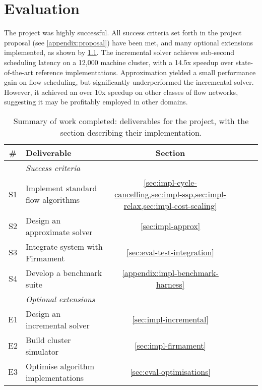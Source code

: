 \chapter{Evaluation} \label{chap:eval}

The project was highly successful. All success criteria set forth in the project proposal (see \cref{appendix:proposal}) have been met, and many optional extensions implemented, as shown by \cref{table:eval-project-requirements}. The incremental solver achieves sub-second scheduling latency on a 12,000 machine cluster, with a 14.5x speedup over state-of-the-art reference implementations. Approximation yielded a small performance gain on flow scheduling, but significantly underperformed the incremental solver. However, it achieved an over 10x speedup on other classes of flow networks, suggesting it may be profitably employed in other domains.

\begin{table}
    \centering
    \begin{tabular}{clcccc}
        \textbf{\#} & \textbf{Deliverable} & \textbf{Section}
        \tabularnewline
        \hline
        & \textit{Success criteria} \tabularnewline
        S1 & Implement standard flow algorithms & \cref{sec:impl-cycle-cancelling,sec:impl-ssp,sec:impl-relax,sec:impl-cost-scaling} \tabularnewline
        S2 & Design an approximate solver & \cref{sec:impl-approx} \tabularnewline
        S3 & Integrate system with Firmament & \cref{sec:eval-test-integration} \tabularnewline
        S4 & Develop a benchmark suite & \cref{appendix:impl-benchmark-harness} \tabularnewline
        \hline
        & \textit{Optional extensions} \tabularnewline
        E1 & Design an incremental solver & \cref{sec:impl-incremental} \tabularnewline
        E2 & Build cluster simulator & \cref{sec:impl-firmament} \tabularnewline
        E3 & Optimise algorithm implementations & \cref{sec:eval-optimisations} \tabularnewline
        \hline
    \end{tabular}
    \crefsections
    \caption[Summary of work completed]{Summary of work completed: deliverables for the project, with the section describing their implementation.}
    \label{table:eval-project-requirements}
\end{table}

